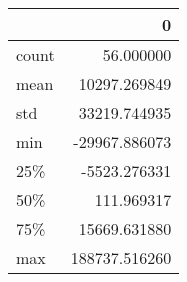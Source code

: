 \begin{tabular}{lr}
\toprule
{} &              0 \\
\midrule
count &      56.000000 \\
mean  &   10297.269849 \\
std   &   33219.744935 \\
min   &  -29967.886073 \\
25\%   &   -5523.276331 \\
50\%   &     111.969317 \\
75\%   &   15669.631880 \\
max   &  188737.516260 \\
\bottomrule
\end{tabular}
